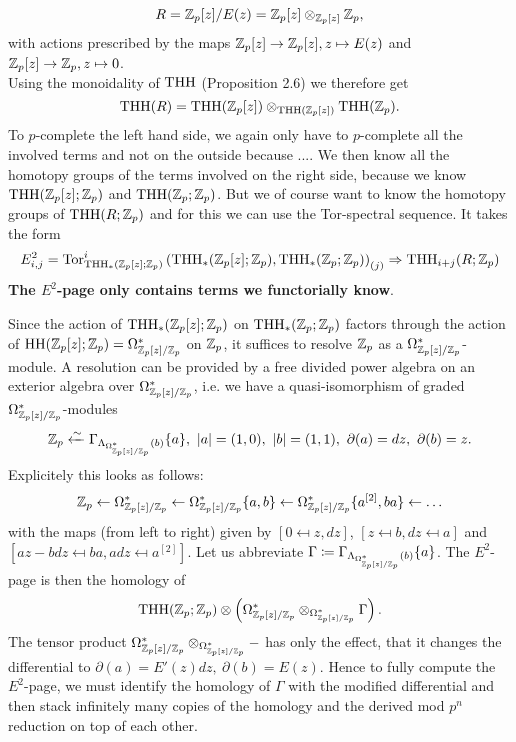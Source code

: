 \begin{equation*}
    R=\mathbb{Z}_p[z]/E(z)=\mathbb{Z}_p[z]\otimes_{\mathbb{Z}_p[z]}\mathbb{Z}_p,
\end{equation*}
with actions prescribed by the maps $\mathbb{Z}_p[z]\rightarrow \mathbb{Z}_p[z], z\mapsto E(z)$ and $\mathbb{Z}_p[z]\to \mathbb{Z}_p, z\mapsto 0$. \\
Using the monoidality of $\operatorname{THH}$ (Proposition 2.6) we therefore get 
\begin{equation*}
    \operatorname{THH}(R)=\operatorname{THH}(\mathbb{Z}_p[z])\otimes_{\operatorname{THH}(\mathbb{Z}_p[z])}\operatorname{THH}(\mathbb{Z}_p).
\end{equation*}
To $p$-complete the left hand side, we again only have to $p$-complete all the involved terms and not on the outside because .... We then know all the homotopy groups of the terms involved on the right side, because we know $\operatorname{THH}(\mathbb{Z}_p[z];\mathbb{Z}_p) $ and $\operatorname{THH}(\mathbb{Z}_p;\mathbb{Z}_p)$. But we of course want to know the homotopy groups of $\operatorname{THH}(R;\mathbb{Z}_p)$ and for this we can use the Tor-spectral sequence. 
It takes the form
\begin{equation*}
    E^2_{i,j}=\operatorname{Tor}_{\operatorname{THH}_*(\mathbb{Z}_p[z];\mathbb{Z}_p)}^i\left( \operatorname{THH}_*(\mathbb{Z}_p[z];\mathbb{Z}_p),\operatorname{THH}_*(\mathbb{Z}_p;\mathbb{Z}_p)\right)_{(j)}\Rightarrow \operatorname{THH}_{i+j}(R;\mathbb{Z}_p)
\end{equation*}
\textbf{The $E^2$-page only contains terms we functorially know}.

Since the action of $\operatorname{THH}_*(\mathbb{Z}_p[z];\mathbb{Z}_p)$ on $\operatorname{THH}_*(\mathbb{Z}_p;\mathbb{Z}_p)$ factors through the action of $\operatorname{HH}(\mathbb{Z}_p[z];\mathbb{Z}_p)=\Omega^*_{\mathbb{Z}_p[z]/\mathbb{Z}_p}$ on $\mathbb{Z}_p$, it suffices to resolve $\mathbb{Z}_p$ as a $\Omega^*_{\mathbb{Z}_p[z]/\mathbb{Z}_p}$-module. A resolution can be provided by a free divided power algebra on an exterior algebra over $\Omega^*_{\mathbb{Z}_p[z]/\mathbb{Z}_p}$, i.e. we have a quasi-isomorphism of graded $\Omega^*_{\mathbb{Z}_p[z]/\mathbb{Z}_p}$-modules
\begin{equation*}
    \Z_p \lai \Gamma_{\Lambda_{\Omega^*_{\Z_p[z]/\Z_p}}(b)}\{a\}, \ |a|=(1,0), \ |b|=(1,1), \ \partial(a)=dz, \ \partial(b)=z.
\end{equation*}
Explicitely this looks as follows:
\begin{align*}
    \mathbb{Z}_p\leftarrow \Omega^*_{\mathbb{Z}_p[z]/\mathbb{Z}_p}\leftarrow \Omega^*_{\mathbb{Z}_p[z]/\mathbb{Z}_p}\{a,b\}\leftarrow \Omega^*_{\mathbb{Z}_p[z]/\mathbb{Z}_p}\{a^{[2]}, ba\}\leftarrow \dots 
\end{align*}
with the maps (from left to right) given by  $[0\mapsfrom z, dz]$, $[z\mapsfrom b, dz\mapsfrom a]$ and $[az-bdz \mapsfrom ba, adz \mapsfrom a^{[2]}]$.
Let us abbreviate $\Gamma\coloneqq \Gamma_{\Lambda_{\Omega^*_{\mathbb{Z}_p[z]/\mathbb{Z}_p}}(b)}\{a\}$. The $E^2$-page is then the homology of
\begin{equation*}
    \operatorname{THH}(\mathbb{Z}_p;\mathbb{Z}_p)\otimes 
        \left(   
        \Omega^*_{\mathbb{Z}_p[z]/\mathbb{Z}_p} \otimes_{\Omega^*_{\mathbb{Z}_p[z]/\mathbb{Z}_p}} \Gamma   
        \right).
\end{equation*} 
The tensor product $\Omega^*_{\mathbb{Z}_p[z]/\mathbb{Z}_p} \otimes_{\Omega^*_{\mathbb{Z}_p[z]/\mathbb{Z}_p}}-$ has only the effect, that it changes the differential to $\partial(a)=E'(z)dz, \ \partial(b)=E(z)$. Hence to fully compute the $E^2$-page, we must identify the homology of $\Gamma$ with the modified differential and then stack infinitely many copies of the homology and the derived mod $p^n$ reduction on top of each other.

